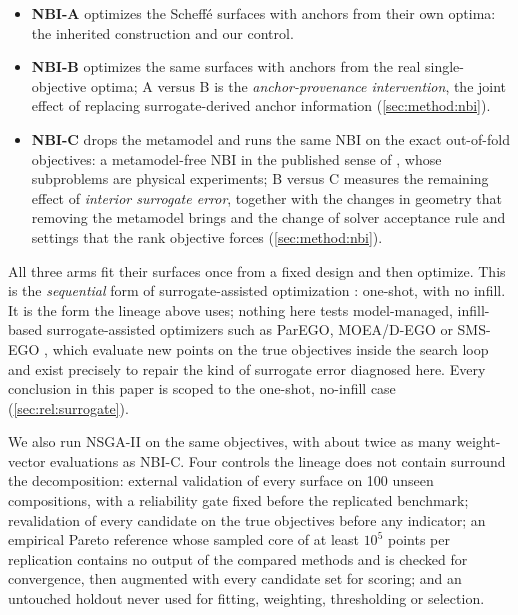 \begin{itemize}
\item \textbf{NBI-A} optimizes the Scheffé surfaces with anchors from their own optima: the inherited construction and
our control.
\item \textbf{NBI-B} optimizes the same surfaces with anchors from the real single-objective optima; A versus B
is the \emph{anchor-provenance intervention}, the joint effect of replacing surrogate-derived anchor information
(\cref{sec:method:nbi}).
\item \textbf{NBI-C} drops the metamodel and runs the same NBI on the exact out-of-fold objectives: a
metamodel-free NBI in the published sense of \citet{gellerich2023doenbi}, whose subproblems are physical experiments;
B versus C measures the remaining effect of \emph{interior surrogate error}, together with the changes in geometry
that removing the metamodel brings and the change of solver acceptance rule and settings that the rank objective
forces (\cref{sec:method:nbi}).
\end{itemize}

All three arms fit their surfaces once from a fixed design and then optimize. This is the \emph{sequential} form of
surrogate-assisted optimization \citep{tabatabaei2015survey}: one-shot, with no infill. It is the form the
lineage above uses; nothing here tests model-managed, infill-based surrogate-assisted optimizers such as ParEGO,
MOEA/D-EGO or SMS-EGO \citep{knowles2006parego,zhang2010moeadego,ponweiser2008smsego}, which evaluate new points on
the true objectives inside the search loop and exist precisely to repair the kind of surrogate error diagnosed here.
Every conclusion in this paper is scoped to the one-shot, no-infill case (\cref{sec:rel:surrogate}).

We also run NSGA-II on the same objectives, with about twice as many weight-vector evaluations as NBI-C. Four controls
the lineage does not contain surround the decomposition: external validation of every surface on 100 unseen
compositions, with a reliability gate fixed before the replicated benchmark; revalidation of every candidate on the
true objectives before any indicator; an empirical Pareto reference whose sampled core of at least $10^{5}$ points per
replication contains no output of the compared methods and is checked for convergence, then augmented with every
candidate set for scoring; and an untouched holdout never used for fitting, weighting, thresholding or selection.

